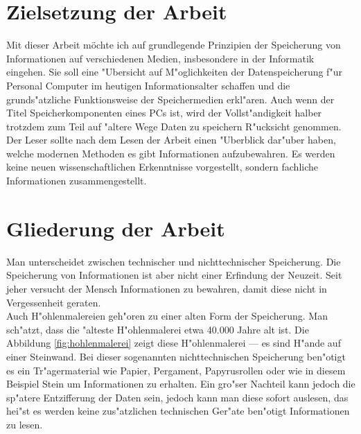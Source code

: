 \section{Zielsetzung der Arbeit}
\label{ch:Einleitung:sec:Zielsetzung}

Mit dieser Arbeit möchte ich auf grundlegende Prinzipien der Speicherung von Informationen auf verschiedenen Medien, insbesondere in der Informatik eingehen. Sie soll eine "Ubersicht auf M"oglichkeiten der Datenspeicherung f"ur Personal Computer im heutigen Informationsalter schaffen und die grunds"atzliche Funktionsweise der Speichermedien erkl"aren. Auch wenn der Titel \glqq Speicherkomponenten eines PCs\grqq{} ist, wird der Vollst"andigkeit halber trotzdem zum Teil auf "altere Wege Daten zu speichern R"ucksicht genommen. Der Leser sollte nach dem Lesen der Arbeit einen "Uberblick dar"uber haben, welche modernen Methoden es gibt Informationen aufzubewahren. Es werden keine neuen wissenschaftlichen Erkenntnisse vorgestellt, sondern fachliche Informationen zusammengestellt.

\section{Gliederung der Arbeit}
\label{ch:Einleitung:sec:Gliederung}

Man unterscheidet zwischen technischer und nichttechnischer Speicherung. Die Speicherung von Informationen ist aber nicht einer Erfindung der Neuzeit. Seit jeher versucht der Mensch Informationen zu bewahren, damit diese nicht in Vergessenheit geraten. 
\\
Auch H"ohlenmalereien geh"oren zu einer alten Form der Speicherung. Man sch"atzt, dass die "alteste H"ohlenmalerei etwa 40.000 Jahre alt ist. Die Abbildung \ref{fig:hohlenmalerei}  zeigt diese H"ohlenmalerei --- es sind H"ande auf einer Steinwand. Bei dieser sogenannten nichttechnischen Speicherung ben"otigt es ein Tr"agermaterial wie Papier, Pergament, Papyrusrollen oder wie in diesem Beispiel Stein um Informationen zu erhalten. Ein gro"ser Nachteil kann jedoch die sp"atere Entzifferung der \glqq Daten\grqq{} sein, jedoch kann man diese sofort auslesen, das hei"st es werden keine zus"atzlichen technischen Ger"ate ben"otigt Informationen zu lesen.

